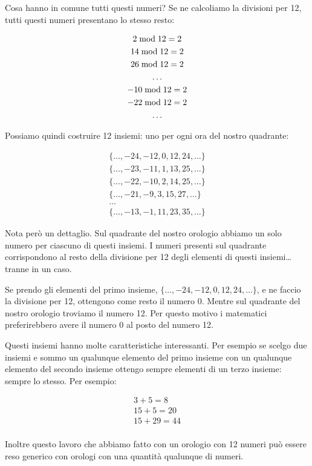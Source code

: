 Cosa hanno in comune tutti questi numeri? Se ne calcoliamo la divisioni per 12, tutti questi numeri presentano lo stesso resto:

\begin{gather*}
    2  \bmod  12 = 2 \\
    14  \bmod  12 = 2 \\
    26  \bmod  12 = 2 \\
    \dots \\
    -10  \bmod  12 = 2 \\
    -22  \bmod  12 = 2 \\
    \dots
\end{gather*}

Possiamo quindi costruire 12 insiemi: uno per ogni ora del nostro quadrante:

\begin{gather*}
    \{\dots, -24, -12, 0, 12, 24, \dots\} \\
    \{\dots, -23, -11, 1, 13, 25, \dots\} \\
    \{\dots, -22, -10, 2, 14, 25, \dots\} \\
    \{\dots, -21, -9, 3, 15, 27, \dots\} \\
    \dots \\
    \{\dots, -13, -1, 11, 23, 35, \dots\} 
\end{gather*}

Nota però un dettaglio. Sul quadrante del nostro orologio abbiamo un solo numero per ciascuno di questi insiemi. I numeri presenti sul quadrante corrispondono al resto della divisione per 12 degli elementi di questi insiemi\dots tranne in un caso.

Se prendo gli elementi del primo insieme, $\{\dots, -24, -12, 0, 12, 24, \dots\}$, e ne faccio la divisione per 12, ottengono come resto il numero 0. Mentre sul quadrante del nostro orologio troviamo il numero 12. Per questo motivo i matematici preferirebbero avere il numero 0 al posto del numero 12.

Questi insiemi hanno molte caratteristiche interessanti. Per esempio se scelgo due insiemi e sommo un qualunque elemento del primo insieme con un qualunque elemento del secondo insieme ottengo sempre elementi di un terzo insieme: sempre lo stesso. Per esempio:

\begin{gather*}
    3 + 5 = 8 \\
    15 + 5 = 20 \\
    15 + 29 = 44 \\
\end{gather*}

Inoltre questo lavoro che abbiamo fatto con un orologio con 12 numeri può essere reso generico con orologi con una quantità qualunque di numeri.
